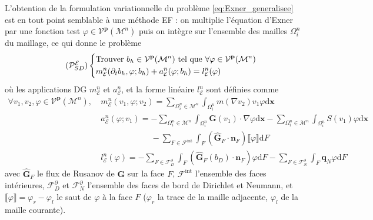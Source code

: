 \documentclass[11pt, a4paper, oneside]{report}
\begin{document}
\begin{samepage}
L'obtention de la formulation variationnelle du problème \eqref{eq:Exner_generalisee} est en tout point semblable à une méthode EF : on multiplie l'équation d'Exner par une fonction test $\varphi \in \mathcal{V}^\mathbf{p}(\mathcal{M}^n)$ puis on intègre sur l'ensemble des mailles $\Omega_i^n$ du maillage, ce qui donne le problème
\begin{equation} \tag{$\mathcal{P}_{SD}^{\mathcal{E}}$} \label{eq:Probleme_variationnel_exner}
    \left \{
    \begin{aligned}
        & \text{Trouver } b_h \in \mathcal{V}^\mathbf{p}(\mathcal{M}^n) \text{ tel que } \forall \varphi \in \mathcal{V}^\mathbf{p}(\mathcal{M}^n) \\
        & m_\mathcal{E}^n(\partial_t b_h, \varphi; b_h) + a_\mathcal{E}^n(\varphi; b_h) = l_\mathcal{E}^n (\varphi)
    \end{aligned}
    \right .
\end{equation}
où les applications DG $m_\mathcal{E}^n$ et $a_\mathcal{E}^n$, et la forme linéaire $l_\mathcal{E}^n$ sont définies comme
\begin{equation}
    \begin{aligned}
        \forall v_1, v_2, \varphi \in \mathcal{V}^\mathbf{p}(\mathcal{M}^n), ~ &m_\mathcal{E}^n(v_1, \varphi; v_2) = \sum_{\Omega_i^n \in \mathcal{M}^n} \int_{\Omega_i^n} m(\nabla v_2) v_1 \varphi \text{d}\bm{x} \\
        & a_\mathcal{E}^n(\varphi; v_1) = - \sum_{\Omega_i^n \in \mathcal{M}^n} \int_{\Omega_i^n} \bm{G}(v_1) \cdot \nabla \varphi \text{d}\bm{x} - \sum_{\Omega_i^n \in \mathcal{M}^n} \int_{\Omega_i^n} S(v_1) \varphi \text{d}\bm{x} \\
        & \phantom{a_\mathcal{E}^n(\varphi; v_1) = } - \sum_{F \in \mathcal{F}^\text{int}} \int_F \left( \bm{\widehat{G}}_F \cdot \bm{n}_F \right) \llbracket \varphi \rrbracket \text{d}F \\
        & l_\mathcal{E}^n(\varphi) = - \sum_{F \in \mathcal{F}_D^\partial} \int_F \left( \bm{\widehat{G}}_F(b_D) \cdot \bm{n}_F \right) \varphi \text{d}F - \sum_{F \in \mathcal{F}_N^\partial} \int_F \bm{q}_N \varphi \text{d}F
    \end{aligned}
\end{equation}
avec $\bm{\widehat{G}}_F$ le flux de Rusanov de $\bm{G}$ sur la face $F$, $\mathcal{F}^\text{int}$ l'ensemble des faces intérieures, $\mathcal{F}_D^\partial$ et $\mathcal{F}_N^\partial$ l'ensemble des faces de bord de Dirichlet et Neumann, et $\llbracket \varphi \rrbracket = \varphi_r - \varphi_l$ le saut de $\varphi$ à la face $F$ ($\varphi_r$ la trace de la maille adjacente, $\varphi_l$ de la maille courante).
\end{samepage}
\end{document}
